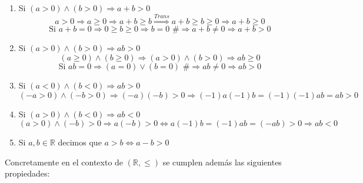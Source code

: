\documentclass[10pt,a4paper,openright]{book}
\begin{document}
\begin{enumerate}
\item Si $(a>0) \wedge (b>0)\Rightarrow a+b>0$
$$a>0\Rightarrow a\geq 0\Rightarrow a+b\geq b \stackrel{Trans}{\Rightarrow} a+b\geq b\geq 0 \Rightarrow a+b\geq 0$$
$$\mbox{Si } a+b=0 \Rightarrow 0\geq b\geq 0\Rightarrow b=0 \mbox{ \#}\Rightarrow a+b\neq 0 \Rightarrow a+b>0$$
\vspace{0.5cm}

\item Si $(a>0)\wedge (b>0)\Rightarrow ab>0$
$$(a\geq 0) \wedge (b\geq 0)\Rightarrow (a>0) \wedge (b>0) \Rightarrow ab\geq 0$$
$$\mbox{Si }ab=0\Rightarrow (a=0)\vee (b=0)\mbox{ \#}\Rightarrow ab\neq 0 \Rightarrow ab>0$$
\vspace{0.5cm}

\item Si $(a<0)\wedge (b<0)\Rightarrow ab>0$
$$(-a>0)\wedge (-b>0)\Rightarrow (-a)(-b)>0\Rightarrow (-1)a(-1)b=(-1)(-1)ab=ab>0$$
\vspace{0.5cm}

\item Si $(a>0)\wedge (b<0)\Rightarrow ab<0$
$$(a>0)\wedge(-b)>0\Rightarrow a(-b)>0\Leftrightarrow a(-1)b=(-1)ab=(-ab)>0\Rightarrow ab<0$$
\vspace{0.5cm}

\item Si $a,b\in \mathbb R$ decimos que $a>b\Leftrightarrow a-b>0$
\end{enumerate}

Concretamente en el contexto de $(\mathbb R, \leq)$ se cumplen además las siguientes propiedades:
\end{document}
